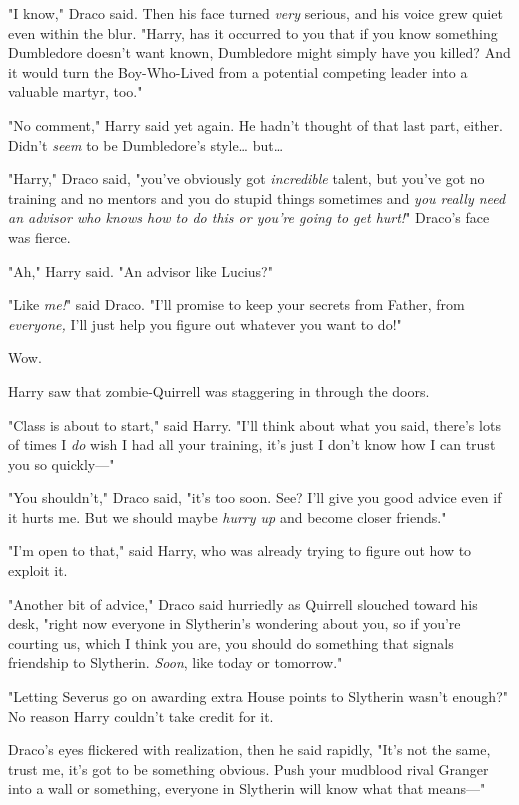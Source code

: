 "I know," Draco said. Then his face turned \emph{very} serious, and his voice 
grew quiet even within the blur. "Harry, has it occurred to you that if you 
know something Dumbledore doesn't want known, Dumbledore might simply have you 
killed? And it would turn the Boy-Who-Lived from a potential competing leader 
into a valuable martyr, too."

"No comment," Harry said yet again. He hadn't thought of that last part, 
either. Didn't \emph{seem} to be Dumbledore's style{\ldots} but{\ldots}

"Harry," Draco said, "you've obviously got \emph{incredible} talent, but you've 
got no training and no mentors and you do stupid things sometimes and \emph{you 
really need an advisor who knows how to do this or you're going to get hurt!}" 
Draco's face was fierce.

"Ah," Harry said. "An advisor like Lucius?"

"Like \emph{me!}" said Draco. "I'll promise to keep your secrets from Father, 
from \emph{everyone,} I'll just help you figure out whatever you want to do!"

Wow.

Harry saw that zombie-Quirrell was staggering in through the doors.

"Class is about to start," said Harry. "I'll think about what you said, there's 
lots of times I \emph{do} wish I had all your training, it's just I don't know 
how I can trust you so quickly---"

"You shouldn't," Draco said, "it's too soon. See? I'll give you good advice 
even if it hurts me. But we should maybe \emph{hurry up} and become closer 
friends."

"I'm open to that," said Harry, who was already trying to figure out how to 
exploit it.

"Another bit of advice," Draco said hurriedly as Quirrell slouched toward his 
desk, "right now everyone in Slytherin's wondering about you, so if you're 
courting us, which I think you are, you should do something that signals 
friendship to Slytherin. \emph{Soon}, like today or tomorrow."

"Letting Severus go on awarding extra House points to Slytherin wasn't enough?" 
No reason Harry couldn't take credit for it.

Draco's eyes flickered with realization, then he said rapidly, "It's not the 
same, trust me, it's got to be something obvious. Push your mudblood rival 
Granger into a wall or something, everyone in Slytherin will know what that 
means---"

